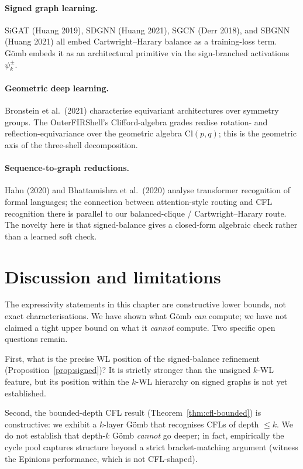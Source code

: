 \documentclass[11pt,a4paper]{article}
\newcommand{\WL}{\textsf{WL}}
\newcommand{\Gomb}{G\"omb}
\begin{document}
\paragraph{Signed graph learning.}
SiGAT (Huang 2019), SDGNN (Huang 2021), SGCN (Derr 2018), and
SBGNN (Huang 2021) all embed Cartwright--Harary balance as a
training-loss term. \Gomb{} embeds it as an architectural primitive
via the sign-branched activations $\psi^{\pm}_k$.

\paragraph{Geometric deep learning.}
Bronstein et al.\ (2021) characterise equivariant architectures
over symmetry groups. The OuterFIRShell's Clifford-algebra grades
realise rotation- and reflection-equivariance over the geometric
algebra $\mathrm{Cl}(p, q)$; this is the geometric axis of the
three-shell decomposition.

\paragraph{Sequence-to-graph reductions.}
Hahn (2020) and Bhattamishra et al.\ (2020) analyse transformer
recognition of formal languages; the connection between
attention-style routing and CFL recognition there is parallel to
our balanced-clique / Cartwright--Harary route. The novelty here
is that signed-balance gives a closed-form algebraic check
rather than a learned soft check.

\section{Discussion and limitations}

The expressivity statements in this chapter are constructive lower
bounds, not exact characterisations. We have shown what \Gomb{}
\emph{can} compute; we have not claimed a tight upper bound on
what it \emph{cannot} compute. Two specific open questions remain.

First, what is the precise WL position of the signed-balance
refinement (Proposition~\ref{prop:signed})? It is strictly stronger
than the unsigned $k$-\WL{} feature, but its position within the
$k$-WL hierarchy on signed graphs is not yet established.

Second, the bounded-depth CFL result (Theorem~\ref{thm:cfl-bounded})
is constructive: we exhibit a $k$-layer \Gomb{} that recognises CFLs
of depth $\leq k$. We do not establish that depth-$k$ \Gomb{}
\emph{cannot} go deeper; in fact, empirically the cycle pool
captures structure beyond a strict bracket-matching argument
(witness the Epinions performance, which is not CFL-shaped).
\end{document}

